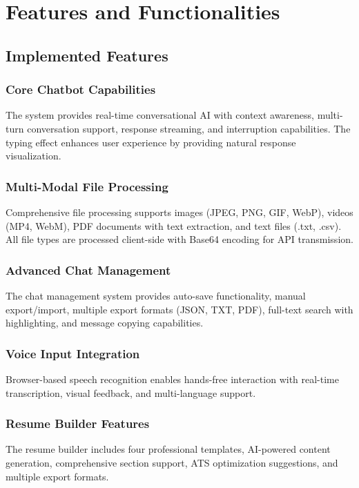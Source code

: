 \documentclass[conference]{IEEEtran}
\begin{document}
\section{Features and Functionalities}

\subsection{Implemented Features}

\subsubsection{Core Chatbot Capabilities}
The system provides real-time conversational AI with context awareness, multi-turn conversation support, response streaming, and interruption capabilities. The typing effect enhances user experience by providing natural response visualization.

\subsubsection{Multi-Modal File Processing}
Comprehensive file processing supports images (JPEG, PNG, GIF, WebP), videos (MP4, WebM), PDF documents with text extraction, and text files (.txt, .csv). All file types are processed client-side with Base64 encoding for API transmission.

\subsubsection{Advanced Chat Management}
The chat management system provides auto-save functionality, manual export/import, multiple export formats (JSON, TXT, PDF), full-text search with highlighting, and message copying capabilities.

\subsubsection{Voice Input Integration}
Browser-based speech recognition enables hands-free interaction with real-time transcription, visual feedback, and multi-language support.

\subsubsection{Resume Builder Features}
The resume builder includes four professional templates, AI-powered content generation, comprehensive section support, ATS optimization suggestions, and multiple export formats.
\end{document}
